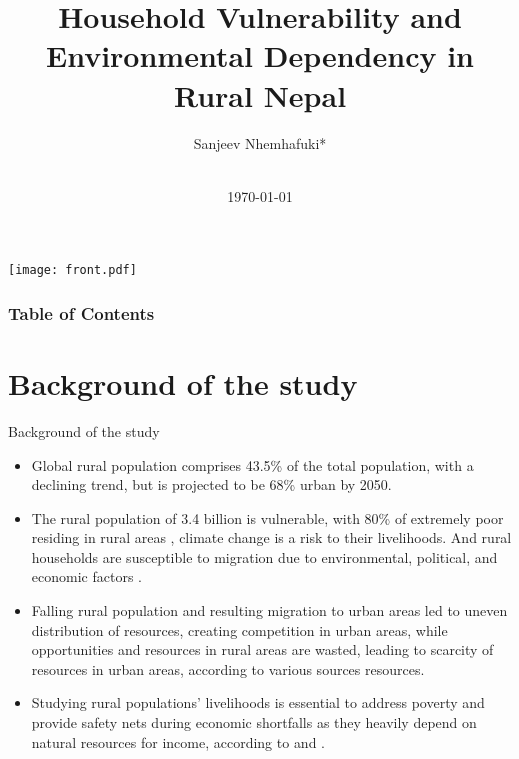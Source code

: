 \documentclass{beamer}
\title[Short Title]{Household Vulnerability and Environmental Dependency in Rural Nepal}
\author[Sanjeev Nhemhafuki]{Sanjeev Nhemhafuki*}
\institute[CEDECONTU]{Central Department of Economics \\ \smallskip {Tribhuvan University}}
\date[\today]{\\
	\vspace{0.7cm}
	\scriptsize \today}
\newcommand{\coloredcite}[2]{\textcolor{blue}{\cite{#2}}}
\begin{document}
	{
		\texttt{[image: front.pdf]}
	}
	\begin{frame}[plain]
		\titlepage  
	\end{frame}
	
	\begin{frame}
		\frametitle{Table of Contents}
		\tableofcontents %
	\end{frame}
	
	
	\section{Background of the study}
	\begin{frame}[t]{Background of the study}
		\begin{itemize}
			\item \begin{justify} 
				\small Global rural population \small\coloredcite{}{r1} comprises 43.5\% of the total population, with a declining trend, but is projected to be 68\% urban by \small\coloredcite{}{r2} 2050.
			\end{justify} 
			
			\item \begin{justify}
				\small The rural population of 3.4 billion \small\coloredcite{}{r3} is vulnerable, with 80\% of extremely poor residing in rural areas \small\coloredcite{}{r4}, climate change \small\coloredcite{}{r5} is a risk to their livelihoods. And rural households are \small\coloredcite{}{r6} susceptible to migration due to environmental, political, and economic factors \small\coloredcite{}{r7}.
			\end{justify}
			\item \begin{justify}
				\small Falling rural population and resulting migration to urban areas led to uneven distribution of resources, creating competition in urban areas, while opportunities and resources in rural areas are wasted, leading \small\coloredcite{}{r8} to scarcity of resources in urban areas, according to various sources resources.
			\end{justify}
			\item \begin{justify}
				\small Studying rural populations’ livelihoods is essential to address poverty and provide safety nets during economic shortfalls as they heavily depend on natural resources for income, according to \small\coloredcite{}{r9} and \small\coloredcite{}{r10}.
			\end{justify}
		\end{itemize}
	\end{frame}
	
\end{document}
